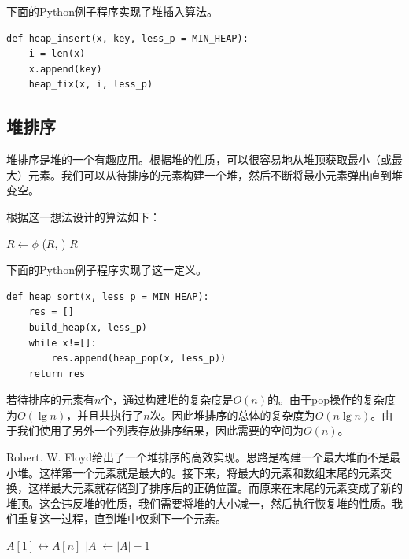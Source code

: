 \documentclass[b5paper]{ctexart}
\begin{document}
下面的Python例子程序实现了堆插入算法。

\lstset{language=Python}
\begin{lstlisting}
def heap_insert(x, key, less_p = MIN_HEAP):
    i = len(x)
    x.append(key)
    heap_fix(x, i, less_p)
\end{lstlisting}

\subsection{堆排序}
\label{heap-sort}

堆排序是堆的一个有趣应用。根据堆的性质，可以很容易地从堆顶获取最小（或最大）元素。我们可以从待排序的元素构建一个堆，然后不断将最小元素弹出直到堆变空。

根据这一想法设计的算法如下：

\begin{algorithmic}[1]
  \State $R \gets \phi$
  \State {}
    \State {}($R$, )
  \EndWhile
  \State \Return $R$
\EndFunction
\end{algorithmic}

下面的Python例子程序实现了这一定义。

\lstset{language=Python}
\begin{lstlisting}
def heap_sort(x, less_p = MIN_HEAP):
    res = []
    build_heap(x, less_p)
    while x!=[]:
        res.append(heap_pop(x, less_p))
    return res
\end{lstlisting}

若待排序的元素有$n$个，通过构建堆的复杂度是$O(n)$的。由于pop操作的复杂度为$O(\lg n)$，并且共执行了$n$次。因此堆排序的总体的复杂度为$O(n \lg n)$。由于我们使用了另外一个列表存放排序结果，因此需要的空间为$O(n)$。

Robert. W. Floyd给出了一个堆排序的高效实现。思路是构建一个最大堆而不是最小堆。这样第一个元素就是最大的。接下来，将最大的元素和数组末尾的元素交换，这样最大元素就存储到了排序后的正确位置。而原来在末尾的元素变成了新的堆顶。这会违反堆的性质，我们需要将堆的大小减一，然后执行恢复堆的性质。我们重复这一过程，直到堆中仅剩下一个元素。

\begin{algorithmic}[1]
  \State {}
    \State {} $A[1] \leftrightarrow A[n]$
    \State $|A| \gets |A| - 1$
    \State {}
  \EndWhile
\EndFunction
\end{algorithmic}
\end{document}
